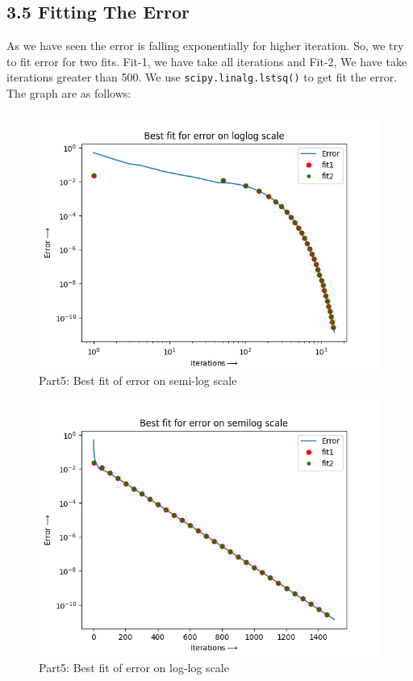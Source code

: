 \documentclass[12pt, a4paper]{report}
\begin{document}
 \subsection*{3.5 Fitting The Error}
  As we have seen the error is falling exponentially for higher iteration. So, we try to fit error for two fits. Fit-1, we have take all iterations and Fit-2, We have take iterations greater than 500. We use \texttt{scipy.linalg.lstsq()} to get fit the error.
  The graph are as follows:
  \begin{figure}[H]
	\centering
	\includegraphics[scale=0.8]{Figure_6.png}
	\caption{Part5: Best fit of error on semi-log scale}
	\label{fig:6}
  \end{figure}
  \begin{figure}[H]
	\centering
	\includegraphics[scale=0.8]{Figure_5.png}
	\caption{Part5: Best fit of error on log-log scale}
	\label{fig:5}
  \end{figure}
  
\end{document}
